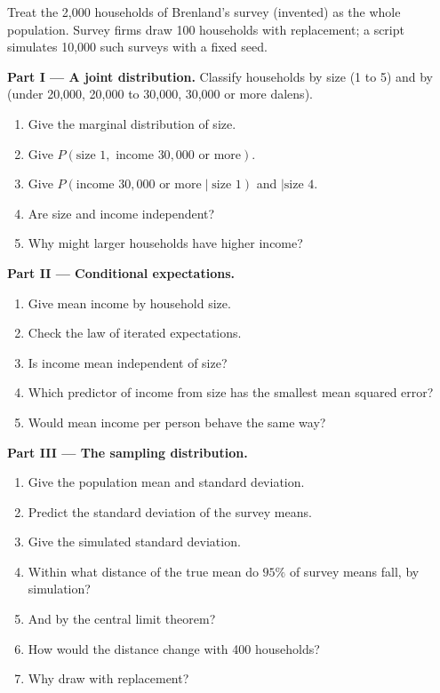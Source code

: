 \begin{problem}\label{pb:b1:random-variables-for-econometrics:lottery}
Treat the 2,000 households of Brenland's survey (invented) as the whole
population. Survey firms draw 100 households with replacement; a script
simulates 10,000 such surveys with a fixed seed.

\medskip\noindent\textbf{Part I --- A joint distribution.} Classify households by
size (1 to 5) and by  (under 20,000, 20,000 to 30,000, 30,000 or
more dalens).
\begin{enumerate}
  \item Give the marginal distribution of size.
  \item Give $P(\text{size } 1, \text{ income } 30{,}000 \text{ or more})$.
  \item Give $P(\text{income } 30{,}000 \text{ or more} \mid \text{size } 1)$ and $\mid \text{size } 4$.
  \item Are size and income independent?
  \item Why might larger households have higher income?
\end{enumerate}

\medskip\noindent\textbf{Part II --- Conditional expectations.}
\begin{enumerate}[resume]
  \item Give mean income by household size.
  \item Check the law of iterated expectations.
  \item Is income mean independent of size?
  \item Which predictor of income from size has the smallest mean squared error?
  \item Would mean income per person behave the same way?
\end{enumerate}

\medskip\noindent\textbf{Part III --- The sampling distribution.}
\begin{enumerate}[resume]
  \item Give the population mean and standard deviation.
  \item Predict the standard deviation of the survey means.
  \item Give the simulated standard deviation.
  \item Within what distance of the true mean do $95\%$ of survey means fall, by simulation?
  \item And by the central limit theorem?
  \item How would the distance change with 400 households?
  \item Why draw with replacement?
\end{enumerate}


\end{problem}
